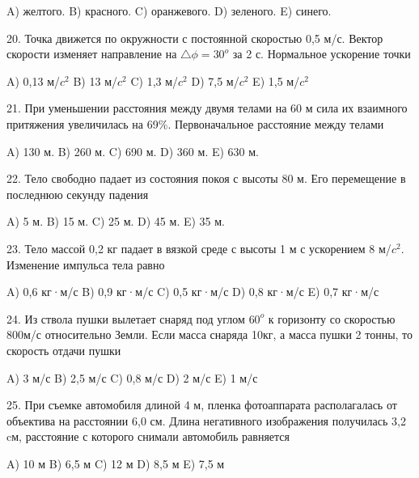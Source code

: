 \documentclass[12pt]{article}
\begin{document}
A) желтого.
B) красного.
C) оранжевого.
D) зеленого.
E) синего. 

20. Точка движется по окружности с постоянной скоростью 0,5 м/с. Вектор скорости изменяет направление на $\triangle\phi=30^o$ за 2 с. Нормальное ускорение точки

A) 0,13 м/$c^2$
B) 13 м/$c^2$
C) 1,3 м/$c^2$
D) 7,5 м/$c^2$
E) 1,5 м/$c^2$

21. При уменьшении расстояния между двумя телами на 60 м сила их взаимного притяжения увеличилась на 69\%. Первоначальное расстояние между телами

A) 130 м.
B) 260 м.
C) 690 м.
D) 360 м.
E) 630 м. 

22. Тело свободно падает из состояния покоя с высоты 80 м. Его перемещение в последнюю секунду падения

A) 5 м.
B) 15 м.
C) 25 м.
D) 45 м.
E) 35 м.

23. Тело массой 0,2 кг падает в вязкой среде с высоты 1 м с ускорением 8 м/$c^2$. Изменение импульса тела равно

A) 0,6 кг·м/с
B) 0,9 кг·м/с
C) 0,5 кг·м/с
D) 0,8 кг·м/с
E) 0,7 кг·м/с

24. Из ствола пушки вылетает снаряд под углом $60^o$ к горизонту со скоростью 800м/с относительно Земли. Если масса снаряда 10кг, а масса пушки 2 тонны, то скорость отдачи пушки

A) 3 м/с
B) 2,5 м/с
C) 0,8 м/с
D) 2 м/с
E) 1 м/с

25. При съемке автомобиля длиной 4 м, пленка фотоаппарата располагалась от объектива на расстоянии 6,0 см. Длина негативного изображения получилась 3,2 cм, расстояние с которого снимали автомобиль равняется 

A) 10 м
B) 6,5 м
C) 12 м
D) 8,5 м
E) 7,5 м
\end{document}
